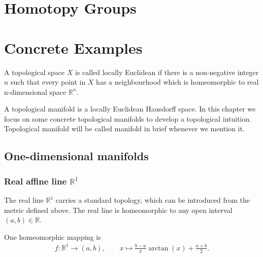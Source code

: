 \documentclass{report}
\begin{document}
\chapter{Homotopy Groups}




\chapter{Concrete Examples}
A topological space $X$ is called locally Euclidean if there is a non-negative integer $n$ such that every point in $X$ has a neighbourhood which is homeomorphic to real n-dimensional space $\mathbb{R}^n$.

\indent A topological manifold is a locally Euclidean Hausdorff space. In this chapter we focus on some concrete topological manifolds to develop a topological intuition. Topological manifold will be called manifold in brief whenever we mention it.

\section{One-dimensional manifolds}
\subsection{Real affine line $\mathbb{R}^1$}
The real line $\mathbb{R}^1$ carries a standard topology, which can be introduced from the metric defined above. The real line is homeomorphic to any open interval $(a, b)\in\mathbb{R}$.
\begin{center}
\end{center}
One homeomorphic mapping is
\begin{align*}
	f:\mathbb{R}^1\longrightarrow(a, b),\qquad
	x\longmapsto \frac{b-a}{\pi}\arctan\left(x\right)+\frac{a+b}{2}.
\end{align*}
\end{document}
